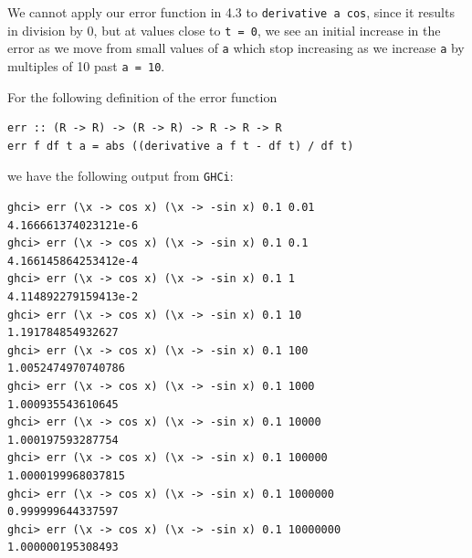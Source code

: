 We cannot apply our error function in 4.3 to \verb|derivative a cos|, since it results in 
division by 0, but at values close to \verb|t = 0|, we see an initial increase in the error 
as we move from small values of \verb|a| which stop increasing as we increase \verb|a| by 
multiples of 10 past \verb|a = 10|.\par
\qquad For the following definition of the error function
\begin{lstlisting}
err :: (R -> R) -> (R -> R) -> R -> R -> R
err f df t a = abs ((derivative a f t - df t) / df t)   
\end{lstlisting}
we have the following output from \verb|GHCi|:
\begin{lstlisting}
ghci> err (\x -> cos x) (\x -> -sin x) 0.1 0.01
4.166661374023121e-6
ghci> err (\x -> cos x) (\x -> -sin x) 0.1 0.1
4.166145864253412e-4
ghci> err (\x -> cos x) (\x -> -sin x) 0.1 1
4.114892279159413e-2
ghci> err (\x -> cos x) (\x -> -sin x) 0.1 10
1.191784854932627
ghci> err (\x -> cos x) (\x -> -sin x) 0.1 100
1.0052474970740786
ghci> err (\x -> cos x) (\x -> -sin x) 0.1 1000
1.000935543610645
ghci> err (\x -> cos x) (\x -> -sin x) 0.1 10000
1.000197593287754
ghci> err (\x -> cos x) (\x -> -sin x) 0.1 100000
1.0000199968037815
ghci> err (\x -> cos x) (\x -> -sin x) 0.1 1000000
0.999999644337597
ghci> err (\x -> cos x) (\x -> -sin x) 0.1 10000000
1.000000195308493
\end{lstlisting}
